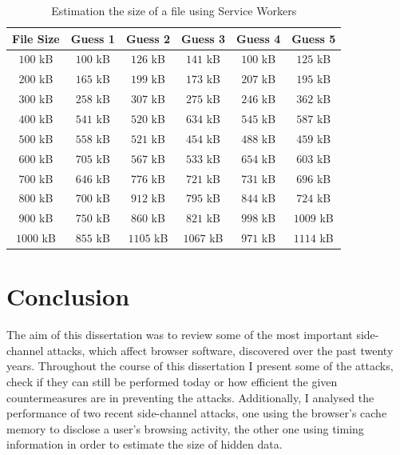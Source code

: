 \documentclass[10pt,a4paper,twoside]{book}
\begin{document}
\begin{table}[h]
\centering
\begin{tabular}{|c|c|c|c|c|c|}
\hline
\textbf{File Size} & \textbf{Guess 1} & \textbf{Guess 2} & \textbf{Guess 3} & \textbf{Guess 4} & \textbf{Guess 5} \\
\hline
$100$ kB & $100$ kB & $126$ kB & $141$ kB & $100$ kB & $125$ kB \\
\hline
$200$ kB & $165$ kB & $199$ kB & $173$ kB & $207$ kB & $195$ kB \\
\hline
$300$ kB & $258$ kB & $307$ kB & $275$ kB & $246$ kB & $362$ kB \\
\hline
$400$ kB & $541$ kB & $520$ kB & $634$ kB & $545$ kB & $587$ kB \\
\hline
$500$ kB & $558$ kB & $521$ kB & $454$ kB & $488$ kB & $459$ kB \\
\hline
$600$ kB & $705$ kB & $567$ kB & $533$ kB & $654$ kB & $603$ kB \\
\hline
$700$ kB & $646$ kB & $776$ kB & $721$ kB & $731$ kB & $696$ kB \\
\hline
$800$ kB & $700$ kB & $912$ kB & $795$ kB & $844$ kB & $724$ kB \\
\hline
$900$ kB & $750$ kB & $860$ kB & $821$ kB & $998$ kB & $1009$ kB \\
\hline
$1000$ kB & $855$ kB & $1105$ kB & $1067$ kB & $971$ kB & $1114$ kB \\
\hline
\end{tabular}
\caption{Estimation the size of a file using Service Workers}
\label{tab:guessSW}
\end{table}


\chapter{Conclusion}
\label{chap:conclusion}

The aim of this dissertation was to review some of the most important side-channel attacks, which affect browser software, discovered over the past twenty years. Throughout the course of this dissertation I present some of the attacks, check if they can still be performed today or how efficient the given countermeasures are in preventing the attacks. Additionally, I analysed the performance of two recent side-channel attacks, one using the browser's cache memory to disclose a user's browsing activity, the other one using timing information in order to estimate the size of hidden data.
\end{document}
